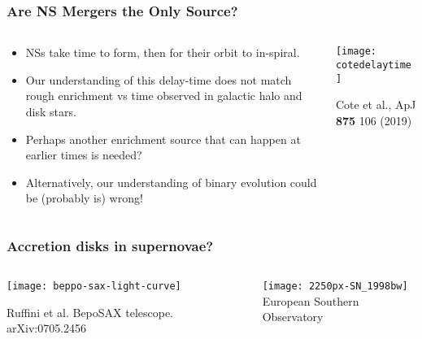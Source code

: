 \documentclass[]{beamer}
\begin{document}
\begin{frame}
  \frametitle{Are NS Mergers the Only Source?}
  \begin{columns}
    \begin{column}{6cm}
      \begin{itemize}
      \item NSs take time to form, then for their orbit to in-spiral.
      \item Our understanding of this delay-time does not match rough
        enrichment vs time observed in galactic halo and disk stars.
      \item Perhaps another enrichment source that can happen at
        earlier times is needed?
      \item Alternatively, our understanding of binary evolution could
        be (probably is) wrong!
      \end{itemize}
    \end{column}
    \begin{column}{6cm}
      \begin{center}
        \texttt{[image: cotedelaytime]}
      \end{center}
      Cote et al., ApJ \textbf{875} 106 (2019)
    \end{column}
  \end{columns}
\end{frame}

\begin{frame}
  \frametitle{Accretion disks in supernovae?}
  \begin{columns}
    \begin{column}{6cm}
      \begin{center}
        \texttt{[image: beppo-sax-light-curve]}
      \end{center}
      Ruffini et al. BepoSAX telescope. arXiv:0705.2456
    \end{column}
    \begin{column}{6cm}
      \begin{center}
        \texttt{[image: 2250px-SN\_1998bw]}\\
        European Southern Observatory
      \end{center}
    \end{column}
  \end{columns}
\end{frame}
\end{document}
